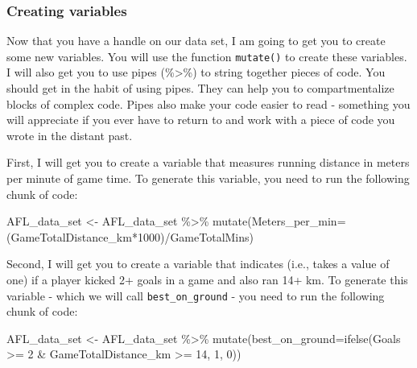 \documentclass[
]{article}
\newenvironment{Shaded}{\begin{snugshade}}{\end{snugshade}}
\newcommand{\AttributeTok}[1]{\textcolor[rgb]{0.77,0.63,0.00}{#1}}
\newcommand{\DecValTok}[1]{\textcolor[rgb]{0.00,0.00,0.81}{#1}}
\newcommand{\FunctionTok}[1]{\textcolor[rgb]{0.00,0.00,0.00}{#1}}
\newcommand{\NormalTok}[1]{#1}
\newcommand{\OtherTok}[1]{\textcolor[rgb]{0.56,0.35,0.01}{#1}}
\newcommand{\SpecialCharTok}[1]{\textcolor[rgb]{0.00,0.00,0.00}{#1}}
\begin{document}
\hypertarget{creating-variables}{%
\subsubsection{Creating variables}\label{creating-variables}}

Now that you have a handle on our data set, I am going to get you to
create some new variables. You will use the function \texttt{mutate()}
to create these variables. I will also get you to use pipes
(\%\textgreater\%) to string together pieces of code. You should get in
the habit of using pipes. They can help you to compartmentalize blocks
of complex code. Pipes also make your code easier to read - something
you will appreciate if you ever have to return to and work with a piece
of code you wrote in the distant past.

First, I will get you to create a variable that measures running
distance in meters per minute of game time. To generate this variable,
you need to run the following chunk of code:

\begin{Shaded}
\begin{Highlighting}[]
\NormalTok{AFL\_data\_set }\OtherTok{\textless{}{-}}\NormalTok{ AFL\_data\_set }\SpecialCharTok{\%\textgreater{}\%}
  \FunctionTok{mutate}\NormalTok{(}\AttributeTok{Meters\_per\_min=}\NormalTok{(GameTotalDistance\_km}\SpecialCharTok{*}\DecValTok{1000}\NormalTok{)}\SpecialCharTok{/}\NormalTok{GameTotalMins)}
\end{Highlighting}
\end{Shaded}

Second, I will get you to create a variable that indicates (i.e., takes
a value of one) if a player kicked 2+ goals in a game and also ran 14+
km. To generate this variable - which we will call
\texttt{best\_on\_ground} - you need to run the following chunk of code:

\begin{Shaded}
\begin{Highlighting}[]
\NormalTok{AFL\_data\_set }\OtherTok{\textless{}{-}}\NormalTok{ AFL\_data\_set }\SpecialCharTok{\%\textgreater{}\%}
  \FunctionTok{mutate}\NormalTok{(}\AttributeTok{best\_on\_ground=}\FunctionTok{ifelse}\NormalTok{(Goals }\SpecialCharTok{\textgreater{}=} \DecValTok{2} \SpecialCharTok{\&}\NormalTok{ GameTotalDistance\_km }\SpecialCharTok{\textgreater{}=} \DecValTok{14}\NormalTok{, }\DecValTok{1}\NormalTok{, }\DecValTok{0}\NormalTok{))}
\end{Highlighting}
\end{Shaded}
\end{document}
